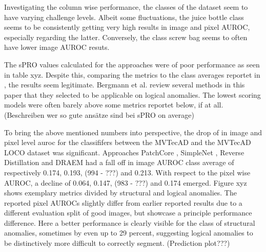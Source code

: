

Investigating the column wise performance, the classes of the dataset seem to have varying challenge levels. Albeit some fluctuations, 
the juice bottle class seems to be consistently getting very high results in image and pixel AUROC, especially regarding the latter. 
Conversely, the class screw bag seems to often have lower image AUROC resuts.




The sPRO values calculated for the approaches were of poor performance as seen in table xyz. Despite this, comparing the metrics to the 
class averages reportet in \cite{LOCODentsAndScratchesBergmann2022}, the results seem legitimate. Bergmann et al. review several methods 
in this paper that they selected to be applicable on logical anomalies. The lowest scoring models were often barely above some metrics reportet 
below, if at all. (Beschreiben wer so gute ansätze sind bei sPRO on average)




To bring the above mentioned numbers into perspective, the drop of in image and pixel level auroc for the classififers between the 
MVTecAD \cite{MVTEC_Bergmann_2021} and the MVTecAD LOCO \cite{LOCODentsAndScratchesBergmann2022} dataset was significant. Approaches 
PatchCore \cite{patchCore2022}, SimpleNet \cite{liu2023simplenet}, Reverse Distillation \cite{revdist2023} and DRAEM \cite{Zavrtanik_2021DRAEM} had a fall off 
in image AUROC class average of respectively 0.174, 0.193, (994 - ???) and 0.213. With respect to the pixel wise 
AUROC, a decline of 0.064, 0.147, (983 - ???) and 0.174 emerged. \newline
Figure xyz shows exemplary metrics divided by structural and logical anomalies. The reported pixel AUROCs slightly differ from earlier reported results due to a different 
evaluation split of good images, but showcase a principle performance difference. Here a better performance is clearly visible for the 
class of structural anomalies, sometimes by even up to 29 percent, suggesting logical anomalies to be distinctively more difficult to correctly segment. (Prediction plot???)

